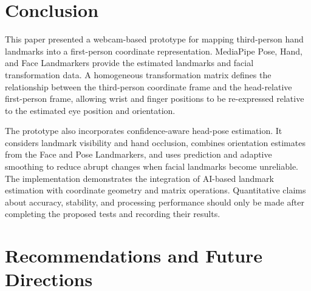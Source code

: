 \documentclass[12pt,a4paper]{article}
\begin{document}
\section{Conclusion}

This paper presented a webcam-based prototype for mapping third-person hand landmarks into a first-person coordinate representation. MediaPipe Pose, Hand, and Face Landmarkers provide the estimated landmarks and facial transformation data. A homogeneous transformation matrix defines the relationship between the third-person coordinate frame and the head-relative first-person frame, allowing wrist and finger positions to be re-expressed relative to the estimated eye position and orientation.

The prototype also incorporates confidence-aware head-pose estimation. It considers landmark visibility and hand occlusion, combines orientation estimates from the Face and Pose Landmarkers, and uses prediction and adaptive smoothing to reduce abrupt changes when facial landmarks become unreliable. The implementation demonstrates the integration of AI-based landmark estimation with coordinate geometry and matrix operations. Quantitative claims about accuracy, stability, and processing performance should only be made after completing the proposed tests and recording their results.

\section{Recommendations and Future Directions}
\end{document}
